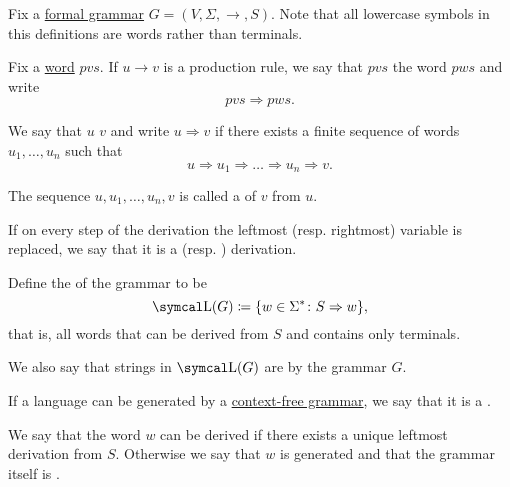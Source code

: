 \begin{definition}\label{def:grammar_derivation}
  Fix a \hyperref[def:grammar]{formal grammar} \( G = (V, \Sigma, \to, S) \). Note that all lowercase symbols in this definitions are words rather than terminals.

  \begin{DefEnum}
     Fix a \hyperref[def:language/word]{word} \( pvs \). If \( u \to v \) is a production rule, we say that \( pvs \)  the word \( pws \) and write
    \begin{equation*}
      pvs \Rightarrow pws.
    \end{equation*}

     We say that \( u \)  \( v \) and write \( u \Rightarrow v \) if there exists a finite sequence of words \( u_1, \ldots, u_n \) such that
    \begin{equation*}
      u \Rightarrow u_1 \Rightarrow \ldots \Rightarrow u_n \Rightarrow v.
    \end{equation*}

    The sequence \( u, u_1, \ldots, u_n, v \) is called a  of \( v \) from \( u \).

     If on every step of the derivation the leftmost (resp. rightmost) variable is replaced, we say that it is a  (resp. ) derivation.

     Define the  of the grammar to be
    \begin{equation*}
      \CL(G) \coloneqq \{ w \in \Sigma^* \colon S \Rightarrow w \},
    \end{equation*}
    that is, all words that can be derived from \( S \) and contains only terminals.

    We also say that strings in \( \CL(G) \) are  by the grammar \( G \).

    If a language can be generated by a \hyperref[def:grammar/context_free]{context-free grammar}, we say that it is a .

    We say that the word \( w \) can be derived  if there exists a unique leftmost derivation from \( S \). Otherwise we say that \( w \) is generated  and that the grammar itself is .
  \end{DefEnum}
\end{definition}


